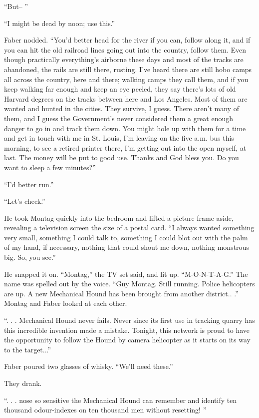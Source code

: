 \documentclass[11pt,openany]{book}
\begin{document}
``But-- ''

``I might be dead by noon; use this.''

Faber nodded. ``You'd better head for the river if you can, follow along it, and if you can hit the old railroad lines going out into the country, follow them. Even though practically everything's airborne these days and most of the tracks are abandoned, the rails are still there, rusting. I've heard there are still hobo camps all across the country, here and there; walking camps they call them, and if you keep walking far enough and keep an eye peeled, they say there's lots of old Harvard degrees on the tracks between here and Los Angeles. Most of them are wanted and hunted in the cities. They survive, I guess. There aren't many of them, and I guess the Government's never considered them a great enough danger to go in and track them down. You might hole up with them for a time and get in touch with me in St. Louis, I'm leaving on the five a.m. bus this morning, to see a retired printer there, I'm getting out into the open myself, at last. The money will be put to good use. Thanks and God bless you. Do you want to sleep a few minutes?''

``I'd better run.''

``Let's check.''

He took Montag quickly into the bedroom and lifted a picture frame aside, revealing a television screen the size of a postal card. ``I always wanted something very small, something I could talk to, something I could blot out with the palm of my hand, if necessary, nothing that could shout me down, nothing monstrous big. So, you see.''

He snapped it on. ``Montag,'' the TV set said, and lit up. ``M-O-N-T-A-G.'' The name was spelled out by the voice. ``Guy Montag. Still running. Police helicopters are up. A new Mechanical Hound has been brought from another district.. .'' Montag and Faber looked at each other.

``. . . Mechanical Hound never fails. Never since its first use in tracking quarry has this incredible invention made a mistake. Tonight, this network is proud to have the opportunity to follow the Hound by camera helicopter as it starts on its way to the target...''

Faber poured two glasses of whisky. ``We'll need these.''

They drank.

``. . . nose so sensitive the Mechanical Hound can remember and identify ten thousand odour-indexes on ten thousand men without resetting! ''
\end{document}
